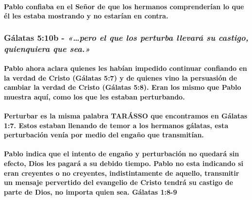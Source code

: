 \documentclass[11a pt,twoside]{article}
\newcommand{\scripture}[1]{%
  {\fontsize{12pt}{16pt}\selectfont\ScriptureFont\itshape #1}%
}
\let\oldsubsubsection\subsubsection
\renewcommand{\subsubsection}{\needspace{4\baselineskip}\oldsubsubsection}
\let\oldparagraph\paragraph
\renewcommand{\paragraph}{\needspace{3\baselineskip}\oldparagraph}
\begin{document}
\paragraph{Pablo confiaba en el Señor de que los hermanos comprenderían
lo que él les estaba mostrando y no estarían en
contra.}\label{pablo-confiaba-en-el-seuxf1or-de-que-los-hermanos-comprenderuxedan-lo-que-uxe9l-les-estaba-mostrando-y-no-estaruxedan-en-contra.}

\subsubsection{\texorpdfstring{Gálatas 5:10b -
\scripture{«…pero el que los perturba llevará su castigo, quienquiera que sea.»}}{Gálatas 5:10b - }}\label{guxe1latas-510b---pero-el-que-los-perturba-llevaruxe1-su-castigo-quienquiera-que-sea.}

\paragraph{Pablo ahora aclara quienes les habían impedido continuar
confiando en la verdad de Cristo (Gálatas 5:7) y de quienes vino la
persuasión de cambiar la verdad de Cristo (Gálatas 5:8). Eran los mismo
que Pablo muestra aquí, como los que les estaban
perturbando.}\label{pablo-ahora-aclara-quienes-les-habuxedan-impedido-continuar-confiando-en-la-verdad-de-cristo-guxe1latas-57-y-de-quienes-vino-la-persuasiuxf3n-de-cambiar-la-verdad-de-cristo-guxe1latas-58.-eran-los-mismo-que-pablo-muestra-aquuxed-como-los-que-les-estaban-perturbando.}

\paragraph{Perturbar es la misma palabra TARÁSSO que encontramos en
Gálatas 1:7. Estos estaban llenando de temor a los hermanos gálatas,
esta perturbación venía por medio del engaño que
transmitían.}\label{perturbar-es-la-misma-palabra-taruxe1sso-que-encontramos-en-guxe1latas-17.-estos-estaban-llenando-de-temor-a-los-hermanos-guxe1latas-esta-perturbaciuxf3n-venuxeda-por-medio-del-engauxf1o-que-transmituxedan.}

\paragraph{Pablo indica que el intento de engaño y perturbación no
quedará sin efecto, Dios les pagará a su debido tiempo. Pablo no esta
indicando si eran creyentes o no creyentes, indistintamente de aquello,
transmitir un mensaje pervertido del evangelio de Cristo tendrá su
castigo de parte de Dios, no importa quien sea. Gálatas
1:8-9}\label{pablo-indica-que-el-intento-de-engauxf1o-y-perturbaciuxf3n-no-quedaruxe1-sin-efecto-dios-les-pagaruxe1-a-su-debido-tiempo.-pablo-no-esta-indicando-si-eran-creyentes-o-no-creyentes-indistintamente-de-aquello-transmitir-un-mensaje-pervertido-del-evangelio-de-cristo-tendruxe1-su-castigo-de-parte-de-dios-no-importa-quien-sea.-guxe1latas-18-9}
\end{document}
